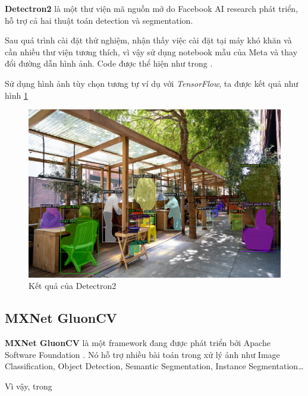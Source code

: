 \textbf{Detectron2}\cite{wu2019detectron2} là một thư viện mã nguồn mở do Facebook AI research phát triển, hỗ trợ cả hai thuật toán detection và segmentation.

Sau quá trình cài đặt thử nghiệm, nhận thấy việc cài đặt tại máy khó khăn và cần nhiều thư viện tương thích, vì vậy sử dụng notebook mẫu của Meta và thay đổi đường dẫn hình ảnh. Code được thể hiện như trong \cite{detectron2demo}.

Sử dụng hình ảnh tùy chọn tương tự ví dụ với \textit{TensorFlow}, ta được kết quả như hình \ref{fig:detection2}

\begin{figure}
    \centering
    \includegraphics[scale=0.2]{../code/processed/detection2.png}
    \caption{Kết quả của Detectron2}
    \label{fig:detection2}
\end{figure}

\subsection{MXNet GluonCV}

\textbf{MXNet GluonCV} là một framework đang được phát triển bởi Apache Software Foundation \cite{apacheglucon,gluoncvnlp2020}. Nó hỗ trợ nhiều bài toán trong xử lý ảnh như Image Classification, Object Detection, Semantic Segmentation, Instance Segmentation\dots

Vì vậy, trong 

